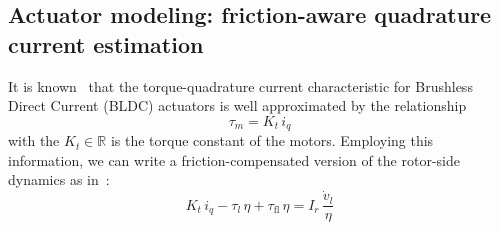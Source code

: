 \subsection{Actuator modeling: friction-aware quadrature current estimation}
It is known~\cite{foc::krause2013analysis} that the torque-quadrature current characteristic for Brushless Direct Current (BLDC) actuators is well approximated by the relationship
\begin{equation}\label{eq:torque_iq}
\tau_m = K_t\,i_q
\end{equation}
with the $K_t\in\mathbb{R}$ is the torque constant of the motors.
Employing this information, we can write a friction-compensated version of the rotor-side dynamics as in~\cite{friction_comp::le2008friction}:
\begin{equation}\label{eq:rotor_dyn_friction}
    K_t\,i_q  - \tau_l\,\eta + 
\tau_{\mathrm{fl}} \, \eta = I_r\,\dfrac{\dot{v}_l}{\eta}
\end{equation}
